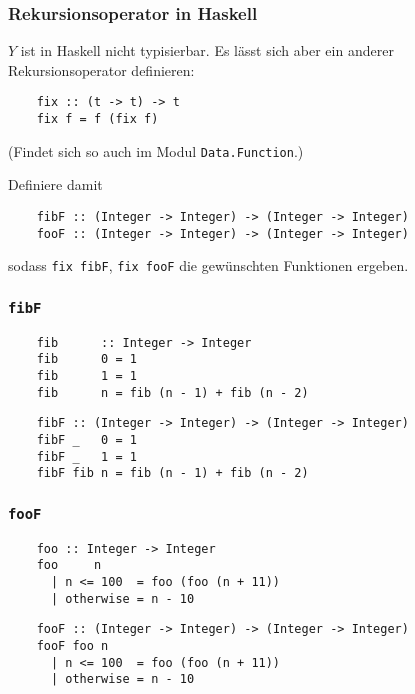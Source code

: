 \documentclass{beamer}
\begin{document}
\begin{frame}[fragile]
  \frametitle{Rekursionsoperator in Haskell}
  $Y$ ist in Haskell nicht typisierbar.
  Es lässt sich aber ein anderer Rekursionsoperator definieren:
  \begin{lstlisting}
    fix :: (t -> t) -> t
    fix f = f (fix f)
  \end{lstlisting}
  (Findet sich so auch im Modul \lstinline{Data.Function}.)
  
  Definiere damit
  \begin{lstlisting}
    fibF :: (Integer -> Integer) -> (Integer -> Integer)
    fooF :: (Integer -> Integer) -> (Integer -> Integer)
  \end{lstlisting}
  sodass \lstinline{fix fibF}, \lstinline{fix fooF} die gewünschten Funktionen ergeben.
\end{frame}

\begin{frame}[fragile]
  \frametitle{\lstinline{fibF}}
  \begin{lstlisting}
    fib      :: Integer -> Integer
    fib      0 = 1
    fib      1 = 1
    fib      n = fib (n - 1) + fib (n - 2)
  \end{lstlisting}
  \pause
  \begin{lstlisting}
    fibF :: (Integer -> Integer) -> (Integer -> Integer)
    fibF _   0 = 1
    fibF _   1 = 1
    fibF fib n = fib (n - 1) + fib (n - 2)
  \end{lstlisting}
\end{frame}

\begin{frame}[fragile]
  \frametitle{\lstinline{fooF}}
  \begin{lstlisting}
    foo :: Integer -> Integer
    foo     n
      | n <= 100  = foo (foo (n + 11))
      | otherwise = n - 10
  \end{lstlisting}
  \pause
  \begin{lstlisting}
    fooF :: (Integer -> Integer) -> (Integer -> Integer)
    fooF foo n
      | n <= 100  = foo (foo (n + 11))
      | otherwise = n - 10
  \end{lstlisting}
\end{frame}
\end{document}
